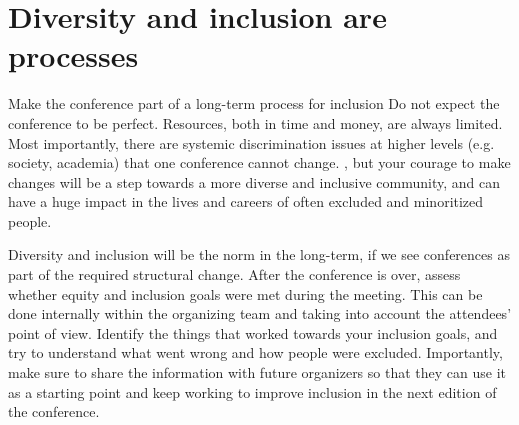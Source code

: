 \documentclass[10pt,letterpaper]{article}
\begin{document}



\section{Diversity and inclusion are processes}
Make the conference part of a long-term process for inclusion
\label{rule_process}
Do not expect the conference to be perfect. 
Resources, both in time and money, are always limited. 
Most importantly, there are systemic discrimination issues at higher levels (e.g. society, academia) that one conference cannot change. 
, but your courage to make changes will be a step towards a more diverse and inclusive community, and can have a huge impact in the lives and careers of often excluded and minoritized people.

Diversity and inclusion will be the norm in the long-term, if we see conferences as part of the required structural change. 
After the conference is over, assess whether equity and inclusion goals were met during the meeting. 
This can be done internally within the organizing team and taking into account the attendees' point of view. 
Identify the things that worked towards your inclusion goals, and try to understand what went wrong and how people were excluded.
Importantly, make sure to share the information with future organizers so that they can use it as a starting point and keep working to improve inclusion in the next edition of the conference. 
\end{document}

